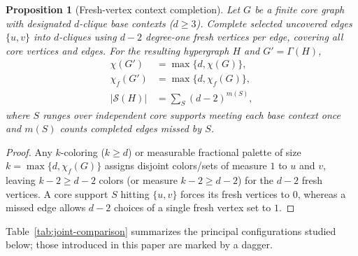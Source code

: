 \documentclass[aps,pra,reprint,superscriptaddress,longbibliography,nofootinbib,floatfix,10pt]{revtex4-2}
\newtheorem{proposition}[theorem]{Proposition}
\theoremstyle{definition}\newtheorem{definition}[theorem]{Definition}
\theoremstyle{remark}\newtheorem{remark}[theorem]{Remark}
\newcommand{\Sc}{\mathcal S}\newcommand{\Cc}{\mathcal C}
\begin{document}
\begin{proposition}[Fresh-vertex context completion]\label{prop:completion}
Let $G$ be a finite core graph with designated $d$-clique base contexts ($d\ge3$). Complete selected uncovered edges $\{u,v\}$ into $d$-cliques using $d-2$ degree-one fresh vertices per edge, covering all core vertices and edges. For the resulting hypergraph $H$ and $G'=\Gamma(H)$,
\begin{equation}\label{eq:completion-chi}
\begin{aligned}
\chi(G')&=\max\{d,\chi(G)\},\\
\chi_f(G')&=\max\{d,\chi_f(G)\},\\
|\Sc(H)|&=\sum_{S}(d-2)^{m(S)},
\end{aligned}
\end{equation}
where $S$ ranges over independent core supports meeting each base context once and $m(S)$ counts completed edges missed by $S$.
\end{proposition}
\begin{proof}
Any $k$-coloring ($k\ge d$) or measurable fractional palette of size $k=\max\{d,\chi_f(G)\}$ assigns disjoint colors/sets of measure $1$ to $u$ and $v$, leaving $k-2\ge d-2$ colors (or measure $k-2\ge d-2$) for the $d-2$ fresh vertices. A core support $S$ hitting $\{u,v\}$ forces its fresh vertices to $0$, whereas a missed edge allows $d-2$ choices of a single fresh vertex set to $1$.
\end{proof}

Table~\ref{tab:joint-comparison} summarizes the principal configurations studied below; those introduced in this paper are marked by a dagger.
\end{document}
